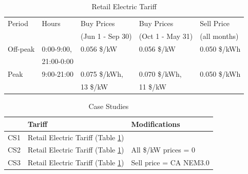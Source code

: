 \documentclass[conference]{IEEEtran}
\begin{document}
\begin{table}[t]
    \centering
    \caption{Retail Electric Tariff}
    \label{tab:tariff}
    \setlength{\tabcolsep}{3pt}
    \begin{tabular}{l l l l l}
        Period & Hours & Buy Prices & Buy Prices & Sell Price  \\
         &  & (Jun 1 - Sep 30) & (Oct 1 - May 31) & (all months) \\
        \hline
        \hline
        Off-peak & 0:00-9:00,  & 0.056 \$/kW  & 0.056 \$/kW & 0.050 \$/kWh \\
                  & 21:00-0:00 &              &        &       \\
        \hline
        Peak     & 9:00-21:00   & 0.075 \$/kWh, & 0.070 \$/kWh, & 0.050 \$/kWh \\
                 &              & 13 \$/kW & 11 \$/kW & \\
        \hline
    \end{tabular}
\end{table}

\begin{table}[t]
    \centering
    \caption{Case Studies}
    \label{tab:case-studies}
    \setlength{\tabcolsep}{6pt}
    \begin{tabular}{l l l}
        & Tariff & Modifications \\
        \hline
        \hline
        CS1 & Retail Electric Tariff (Table \ref{tab:tariff}) & \\
        CS2 & Retail Electric Tariff (Table \ref{tab:tariff}) & All \$/kW prices = 0  \\
        CS3 & Retail Electric Tariff (Table \ref{tab:tariff}) & Sell price = CA NEM3.0 \\
        \hline
    \end{tabular}
\end{table}
\end{document}
